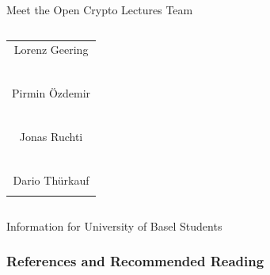 \documentclass[]{beamer}
\begin{document}
\begin{frame}{Meet the Open Crypto Lectures Team}
\begin{columns}[T]
\begin{column}{0.31\textwidth}
\begin{table}
\begin{tabular}{c}
					Lorenz Geering\\
					\href{https://linkedin.com/in/lorenz-geering-770359a8/}{\faLinkedinSquare}\ \href{https://twitter.com/lorenz_geering}{\faTwitterSquare}\\
					\vspace{0.5em}\\
					Pirmin Özdemir\\
					\href{https://www.linkedin.com/in/pirmin-\%C3\%B6zdemir-539845159/}{\faLinkedinSquare}\ \href{https://twitter.com/Pirmin15}{\faTwitterSquare}\\
					\vspace{0.5em}\\
					Jonas Ruchti\\
					\href{https://linkedin.com/in/jonas-ruchti-a29042221}{\faLinkedinSquare}\ \href{https://twitter.com/jonas_ruchti}{\faTwitterSquare}\\
					\vspace{0.5em}\\
					Dario Thürkauf\\
					\href{https://linkedin.com/in/dario-thuerkauf/}{\faLinkedinSquare} \href{https://twitter.com/dario_thuerkauf}{\faTwitterSquare}\\
				\end{tabular}
			\end{table}
		\end{column}
	\end{columns}
\end{frame}

\begin{frame}{Information for University of Basel Students}

	

	

\vspace{1em}


\end{frame}

\begin{frame}%
\frametitle{References and Recommended Reading}
	
	
\end{frame}
\end{document}
